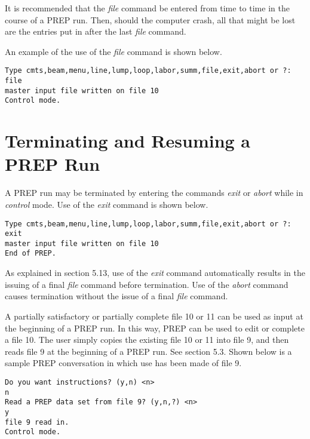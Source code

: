      It is recommended that the {\em file} command be entered from time to time
in the course of a PREP run.  Then, should the computer crash, all that
might be lost are the entries put in after the last {\em file} command.

     An example of the use of the {\em file} command is shown below.

\begin{footnotesize}
\begin{verbatim}
Type cmts,beam,menu,line,lump,loop,labor,summ,file,exit,abort or ?:
file
master input file written on file 10
Control mode.
\end{verbatim}
\end{footnotesize}

\section{Terminating and Resuming a PREP Run}
     A PREP run may be terminated by entering the commands {\em exit} or {\em abort}
while in {\em control} mode.  Use of the {\em exit} command is shown below.

\begin{footnotesize}
\begin{verbatim}
Type cmts,beam,menu,line,lump,loop,labor,summ,file,exit,abort or ?:
exit
master input file written on file 10
End of PREP.
\end{verbatim}
\end{footnotesize}
As explained in section 5.13, use of the {\em exit} command automatically results
in the issuing of a final {\em file} command before termination.  Use of the
{\em abort} command causes termination without the issue of a final {\em file} command.

     A partially satisfactory or partially complete file 10 or 11 can be
used as input at the beginning of a PREP run.  In this way, PREP can be
used to edit or complete a file 10.  The user simply copies the existing
file 10 or 11 into file 9, and then reads file 9 at the beginning of a PREP
run.  See section 5.3.  Shown below is a sample PREP conversation in which
use has been made of file 9.

\begin{footnotesize}
\begin{verbatim}
Do you want instructions? (y,n) <n>
n
Read a PREP data set from file 9? (y,n,?) <n>
y
file 9 read in.
Control mode.
\end{verbatim}
\end{footnotesize}

